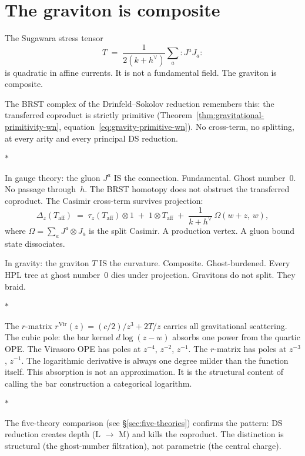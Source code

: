 \documentclass[11pt]{article}
\newcommand{\normord}[1]{:\!#1\!:}
\newcommand{\sep}{\bigskip\begin{center}$*$\end{center}\medskip}
\begin{document}
\section{The graviton is composite}
\label{sec:graviton-composite}

The Sugawara stress tensor
\[
T \;=\; \frac{1}{2(k+h^\vee)}\sum_a \normord{J^a J_a}
\]
is quadratic in affine currents.  It is not a fundamental field.
The graviton is composite.

The BRST complex of the Drinfeld--Sokolov reduction remembers
this: the transferred coproduct is strictly primitive
(Theorem~\ref{thm:gravitational-primitivity-wn},
equation~\eqref{eq:gravity-primitive-wn}).  No cross-term, no
splitting, at every arity and every principal DS reduction.

\sep

In gauge theory: the gluon $J^a$ IS the connection.
Fundamental.  Ghost number~$0$.  No passage through~$h$.  The
BRST homotopy does not obstruct the transferred coproduct.
The Casimir cross-term survives projection:
\[
\Delta_z(T_{\mathrm{aff}})
\;=\;
\tau_z(T_{\mathrm{aff}}) \otimes 1
\;+\; 1 \otimes T_{\mathrm{aff}}
\;+\; \frac{1}{k+h^\vee}\,\Omega(w{+}z,\, w),
\]
where $\Omega = \sum_a J^a \otimes J_a$ is the split Casimir.
A production vertex.  A gluon bound state dissociates.

In gravity: the graviton $T$ IS the curvature.  Composite.
Ghost-burdened.  Every HPL tree at ghost number~$0$ dies under
projection.  Gravitons do not split.  They braid.

\sep

The $r$-matrix $r^{\mathrm{Vir}}(z) = (c/2)/z^3 + 2T/z$
carries all gravitational scattering.  The cubic pole: the bar
kernel $d\log(z-w)$ absorbs one power from the quartic OPE.
The Virasoro OPE has poles at $z^{-4}$, $z^{-2}$, $z^{-1}$.
The $r$-matrix has poles at $z^{-3}$, $z^{-1}$.  The
logarithmic derivative is always one degree milder than the
function itself.  This absorption is not an approximation.  It
is the structural content of calling the bar construction a
categorical logarithm.

\sep

The five-theory comparison (see \S\ref{sec:five-theories})
confirms the pattern: DS reduction creates depth (L $\to$ M)
and kills the coproduct.  The distinction is structural
(the ghost-number filtration), not parametric (the central charge).
\end{document}
